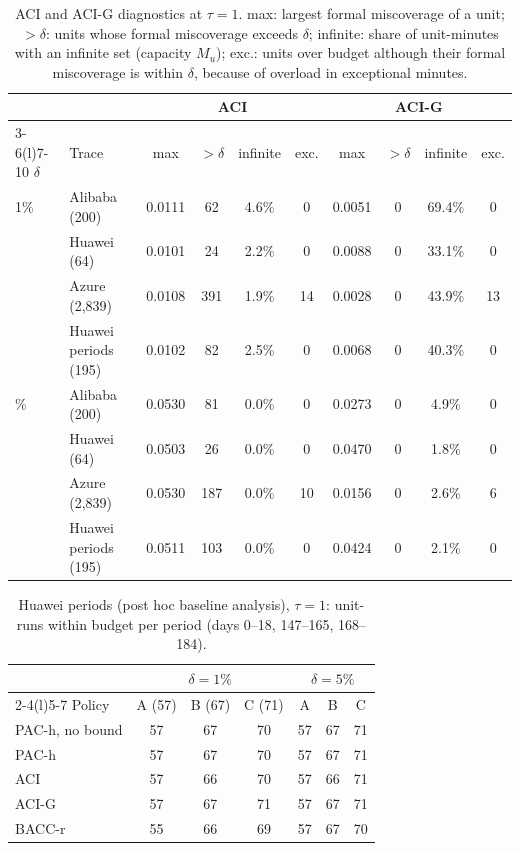 \begin{table}[!htbp]\centering\footnotesize\setlength{\tabcolsep}{4pt}
\caption{ACI and ACI-G diagnostics at $\tau=1$. max: largest formal miscoverage of a unit; $>\delta$: units whose formal miscoverage exceeds $\delta$; infinite: share of unit-minutes with an infinite set (capacity $M_u$); exc.: units over budget although their formal miscoverage is within $\delta$, because of overload in exceptional minutes.}
\label{tab:aci_diag}
\begin{tabular}{@{}llcccccccc@{}}\toprule
 & & \multicolumn{4}{c}{ACI} & \multicolumn{4}{c}{ACI-G} \\ \cmidrule(lr){3-6}\cmidrule(l){7-10}
$\delta$ & Trace & max & $>\delta$ & infinite & exc. & max & $>\delta$ & infinite & exc. \\ \midrule
1\% & Alibaba (200) & 0.0111 & 62 & 4.6\% & 0 & 0.0051 & 0 & 69.4\% & 0 \\
 & Huawei (64) & 0.0101 & 24 & 2.2\% & 0 & 0.0088 & 0 & 33.1\% & 0 \\
 & Azure (2,839) & 0.0108 & 391 & 1.9\% & 14 & 0.0028 & 0 & 43.9\% & 13 \\
 & Huawei periods (195) & 0.0102 & 82 & 2.5\% & 0 & 0.0068 & 0 & 40.3\% & 0 \\
\addlinespace
5\% & Alibaba (200) & 0.0530 & 81 & 0.0\% & 0 & 0.0273 & 0 & 4.9\% & 0 \\
 & Huawei (64) & 0.0503 & 26 & 0.0\% & 0 & 0.0470 & 0 & 1.8\% & 0 \\
 & Azure (2,839) & 0.0530 & 187 & 0.0\% & 10 & 0.0156 & 0 & 2.6\% & 6 \\
 & Huawei periods (195) & 0.0511 & 103 & 0.0\% & 0 & 0.0424 & 0 & 2.1\% & 0 \\
\bottomrule
\end{tabular}\end{table}

\begin{table}[!htbp]\centering\footnotesize\setlength{\tabcolsep}{4pt}
\caption{Huawei periods (post hoc baseline analysis), $\tau=1$: unit-runs within budget per period (days 0--18, 147--165, 168--184).}
\label{tab:adaptive_periods}
\begin{tabular}{@{}lcccccc@{}}\toprule
 & \multicolumn{3}{c}{$\delta=1\%$} & \multicolumn{3}{c}{$\delta=5\%$} \\ \cmidrule(lr){2-4}\cmidrule(l){5-7}
Policy & A (57) & B (67) & C (71) & A & B & C \\ \midrule
PAC-h, no bound & 57 & 67 & 70 & 57 & 67 & 71 \\
PAC-h & 57 & 67 & 70 & 57 & 67 & 71 \\
ACI & 57 & 66 & 70 & 57 & 66 & 71 \\
ACI-G & 57 & 67 & 71 & 57 & 67 & 71 \\
BACC-r & 55 & 66 & 69 & 57 & 67 & 70 \\
\bottomrule\end{tabular}\end{table}

